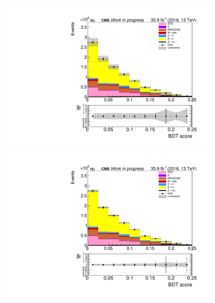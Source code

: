\begin{figure}[htp]
	\begin{multicols}{2}
		\includegraphics[width=\linewidth]{plots/em/ZeroJet_prefit.pdf}\par 
		\includegraphics[width=\linewidth]{plots/em/ZeroJet_postfit.pdf}\par
	\end{multicols}	
\end{figure}

